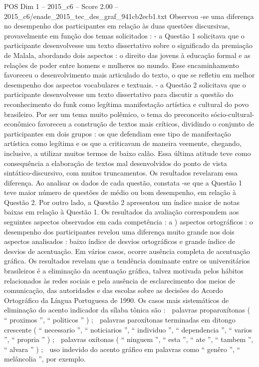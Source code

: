 \begin{textsample}{POS Dim 1 – 2015\_c6 – Score 2.00 – 2015\_c6/enade\_2015\_tec\_des\_graf\_941cb2ecb1.txt}
Observou -se uma diferença no desempenho dos participantes em relação às duas questões discursivas, provavelmente em função dos temas solicitados : - a Questão 1 solicitava que o participante desenvolvesse um texto dissertativo sobre o significado da premiação de Malala, abordando dois aspectos : o direito das jovens à educação formal e as relações de poder entre homens e mulheres no mundo.
Esse encaminhamento favoreceu o desenvolvimento mais articulado do texto, o que se refletiu em melhor desempenho dos aspectos vocabulares e textuais. - a Questão 2 solicitava que o participante desenvolvesse um texto dissertativo para discutir a questão do reconhecimento do funk como legítima manifestação artística e cultural do povo brasileiro.
Por ser um tema muito polêmico, o tema do preconceito sócio-cultural-econômico favoreceu a construção de textos mais críticos, dividindo o conjunto de participantes em dois grupos : os que defendiam esse tipo de manifestação artística como legítima e os que a criticavam de maneira veemente, chegando, inclusive, a utilizar muitos termos de baixo calão.
Essa última atitude teve como consequência a elaboração de textos mal desenvolvidos do ponto de vista sintático-discursivo, com muitos truncamentos.
Os resultados revelaram essa diferença.
Ao analisar os dados de cada questão, constata -se que a Questão 1 teve maior número de questões de médio ou bom desempenho, em relação à Questão 2.
Por outro lado, a Questão 2 apresentou um índice maior de notas baixas em relação à Questão 1.
Os resultados da avaliação correspondem aos seguintes aspectos observados em cada competência : a ) aspectos ortográficos : o desempenho dos participantes revelou uma diferença muito grande nos dois aspectos analisados : baixo índice de desvios ortográficos e grande índice de desvios de acentuação.
Em vários casos, ocorre ausência completa de acentuação gráfica.
Os resultados revelam que a tendência dominante entre os universitários brasileiros é a eliminação da acentuação gráfica, talvez motivada pelos hábitos relacionados às redes sociais e pela ausência de esclarecimento dos meios de comunicação, das autoridades e das escolas sobre as decisões do Acordo Ortográfico da Língua Portuguesa de 1990.
Os casos mais sistemáticos de eliminação do acento indicador da sílaba tônica são :  palavras proparoxítonas ( “ proximos ”, “ politicos ” ) ;  palavras paroxítonas terminadas em ditongo crescente ( “ necessario ”, “ noticiarios ”, “ individuo ”, “ dependencia ”, “ varios ”, “ propria ” ) ;  palavras oxítonas ( “ ninguem ”, “ esta ”, “ ate ”, “ tambem ”, “ alvara ” ) ;  uso indevido do acento gráfico em palavras como “ genêro ”, “ melâncolia ”, por exemplo.

\end{textsample}
